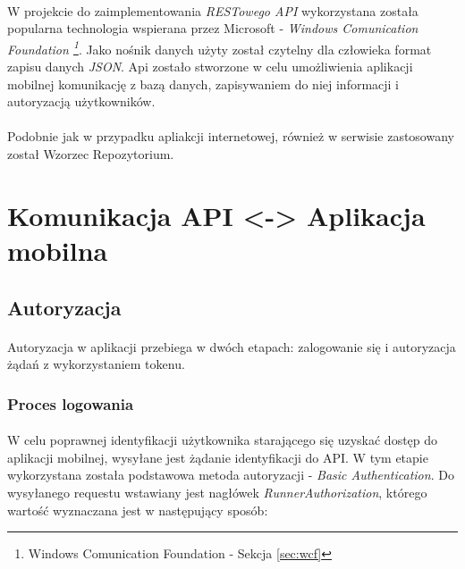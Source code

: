 \paragraph{} %
\label{par:}
W projekcie do zaimplementowania \textit{RESTowego API} wykorzystana została popularna technologia wspierana przez Microsoft - \textit{Windows Comunication Foundation \footnote{ Windows Comunication Foundation - Sekcja \ref{sec:wcf}}}. Jako nośnik danych użyty został czytelny dla człowieka format zapisu danych \textit{JSON}. Api zostało stworzone w celu umożliwienia aplikacji mobilnej komunikację z bazą danych, zapisywaniem do niej informacji i autoryzacją użytkowników.

\paragraph{} %
\label{par:}
Podobnie jak w przypadku apliakcji internetowej, również w serwisie zastosowany został Wzorzec Repozytorium.

\section{Komunikacja API <-> Aplikacja mobilna} %
\label{sec:komunikacja_api_aplikacja_mobilna}

\subsection{Autoryzacja} %
\label{sub:autoryzacja}
\paragraph{} %
\label{par:}

Autoryzacja w aplikacji przebiega w dwóch etapach: zalogowanie się i autoryzacja żądań z wykorzystaniem tokenu. 
\subsubsection{Proces logowania} 
\paragraph{} %
\label{par:}
W celu poprawnej identyfikacji użytkownika starającego się uzyskać dostęp do aplikacji mobilnej, wysyłane jest żądanie identyfikacji do API. W tym etapie wykorzystana została podstawowa metoda autoryzacji - \textit{Basic Authentication}. Do wysyłanego requestu wstawiany jest nagłówek \textit{RunnerAuthorization}, którego wartość wyznaczana jest w następujący sposób:

